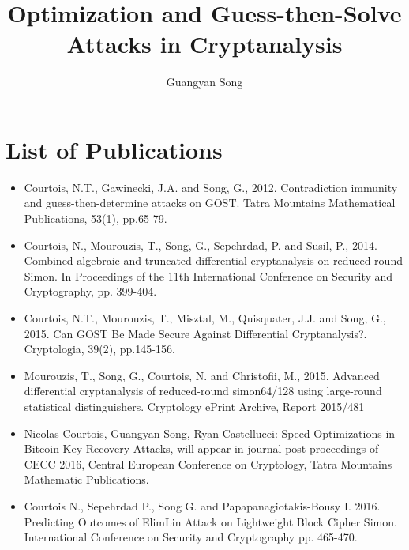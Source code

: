 \documentclass[12pt,phd,a4paper,oneside]{ucl_thesis}
\title{Optimization and Guess-then-Solve Attacks in Cryptanalysis}
\author{Guangyan Song}
\begin{document}
\nobibliography*



\chapter*{List of Publications}
\begin{itemize}
	\item Courtois, N.T., Gawinecki, J.A. and Song, G., 2012. Contradiction immunity and guess-then-determine attacks on GOST. Tatra Mountains Mathematical Publications, 53(1), pp.65-79. 
	\item Courtois, N., Mourouzis, T., Song, G., Sepehrdad, P. and Susil, P., 2014. Combined algebraic and truncated differential cryptanalysis on reduced-round Simon. In Proceedings of the 11th International Conference on Security and Cryptography, pp. 399-404. 
	\item Courtois, N.T., Mourouzis, T., Misztal, M., Quisquater, J.J. and Song, G., 2015. Can GOST Be Made Secure Against Differential Cryptanalysis?. Cryptologia, 39(2), pp.145-156. 
	\item Mourouzis, T., Song, G., Courtois, N. and Christofii, M., 2015. Advanced differential cryptanalysis of reduced-round simon64/128 using large-round statistical distinguishers. Cryptology ePrint Archive, Report 2015/481
	\item Nicolas Courtois, Guangyan Song, Ryan Castellucci:
	Speed Optimizations in Bitcoin Key Recovery Attacks, will appear in journal post-proceedings of CECC 2016,
	Central European Conference on Cryptology, Tatra Mountains Mathematic
	Publications.
	\item Courtois N., Sepehrdad P., Song G. and Papapanagiotakis-Bousy I. 2016. Predicting Outcomes of ElimLin Attack on Lightweight Block Cipher Simon. International Conference on Security and Cryptography pp. 465-470.
\end{itemize}
\end{document}
